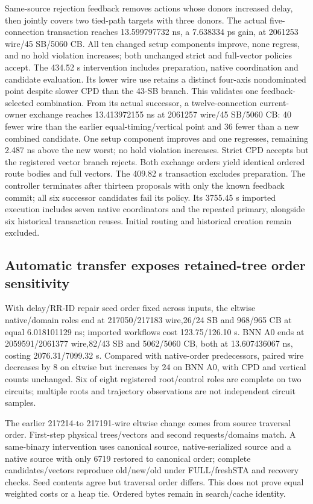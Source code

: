 \documentclass[conference,10pt]{IEEEtran}
\begin{document}
Same-source rejection feedback removes actions whose donors increased delay, then jointly covers two tied-path targets with three donors. The actual five-connection transaction reaches 13.599797732 ns, a 7.638334 ps gain, at 2061253 wire/45 SB/5060 CB. All ten changed setup components improve, none regress, and no hold violation increases; both unchanged strict and full-vector policies accept. The 434.52 s intervention includes preparation, native coordination and candidate evaluation. Its lower wire use retains a distinct four-axis nondominated point despite slower CPD than the 43-SB branch. This validates one feedback-selected combination. From its actual successor, a twelve-connection current-owner exchange reaches 13.413972155 ns at 2061257 wire/45 SB/5060 CB: 40 fewer wire than the earlier equal-timing/vertical point and 36 fewer than a new combined candidate. One setup component improves and one regresses, remaining 2.487 ns above the new worst; no hold violation increases. Strict CPD accepts but the registered vector branch rejects. Both exchange orders yield identical ordered route bodies and full vectors. The 409.82 s transaction excludes preparation. The controller terminates after thirteen proposals with only the known feedback commit; all six successor candidates fail its policy. Its 3755.45 s imported execution includes seven native coordinators and the repeated primary, alongside six historical transaction reuses. Initial routing and historical creation remain excluded.

\subsection{Automatic transfer exposes retained-tree order sensitivity}
With delay/RR-ID repair seed order fixed across inputs, the eltwise native/domain roles end at 217050/217183 wire,26/24 SB and 968/965 CB at equal 6.018101129 ns; imported workflows cost 123.75/126.10 s. BNN A0 ends at 2059591/2061377 wire,82/43 SB and 5062/5060 CB, both at 13.607436067 ns, costing 2076.31/7099.32 s. Compared with native-order predecessors, paired wire decreases by 8 on eltwise but increases by 24 on BNN A0, with CPD and vertical counts unchanged. Six of eight registered root/control roles are complete on two circuits; multiple roots and trajectory observations are not independent circuit samples.

The earlier 217214-to 217191-wire eltwise change comes from source traversal order. First-step physical trees/vectors and second requests/domains match. A same-binary intervention uses canonical source, native-serialized source and a native source with only 6719 restored to canonical order; complete candidates/vectors reproduce old/new/old under FULL/freshSTA and recovery checks. Seed contents agree but traversal order differs. This does not prove equal weighted costs or a heap tie. Ordered bytes remain in search/cache identity.
\end{document}
